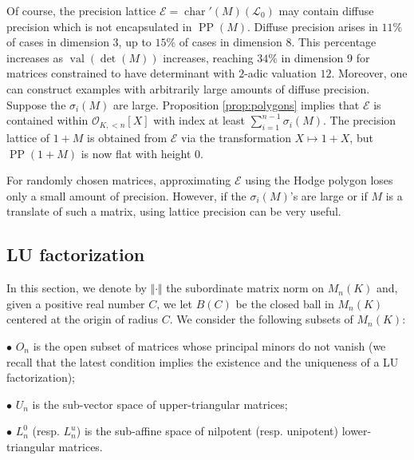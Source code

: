 \documentclass{sig-alternate}
\DeclareMathOperator{\PP}{PP}
\DeclareMathOperator{\val}{val}
\renewcommand{\O}{\mathcal O}
\DeclareMathOperator{\charpoly}{char}
\newcommand{\charp}{\charpoly'}
\begin{document}
Of course, the precision lattice $\mathcal{E} = \charp(M)(\mathcal L_0)$ 
may contain diffuse precision which is not encapsulated in $\PP(M)$.
Diffuse precision arises in $11\%$ of cases in 
dimension $3$, up to $15\%$ of cases in dimension $8$.  This 
percentage increases as $\val(\det(M))$ increases, reaching $34\%$ in 
dimension $9$ for matrices constrained to have determinant with $2$-adic 
valuation $12$.
Moreover, one can construct examples with arbitrarily large amounts of diffuse precision.
Suppose the $\sigma_i(M)$ are large.  
Proposition \ref{prop:polygons} implies that $\mathcal{E}$ is 
contained within $\O_{K, <n}[X]$ with index at least $\sum_{i=1}^{n-1} 
\sigma_i(M)$.  The precision lattice of $1 + M$ is obtained from 
$\mathcal{E}$ via the transformation $X \mapsto 1 + X$, but $\PP(1 + M)$ 
is now flat with height $0$.

For randomly chosen matrices, approximating $\mathcal{E}$ 
using the Hodge polygon loses only a small amount of precision. However,
if the $\sigma_i(M)$'s are large or if $M$ is a translate of
such a matrix, using lattice precision can be very useful.

\subsection{LU factorization}

In this section, we denote by $\Vert \cdot \Vert$ the subordinate matrix norm on $M_n(K)$
and, given a positive real number $C$, we let $B(C)$ be the closed ball 
in $M_n(K)$ centered at the origin of radius $C$. We consider
the following subsets of $M_n(K)$:

\noindent $\bullet$
$O_n$ is the open subset of matrices whose principal 
minors do not vanish (we recall that the latest condition implies the
existence and the uniqueness of a LU factorization);

\noindent $\bullet$
$U_n$ is the sub-vector space of upper-triangular 
matrices;

\noindent $\bullet$
$L_n^0$ (resp. $L_n^u$) is the sub-affine space of 
nilpotent (resp. unipotent) lower-triangular matrices.

\smallskip
\end{document}
